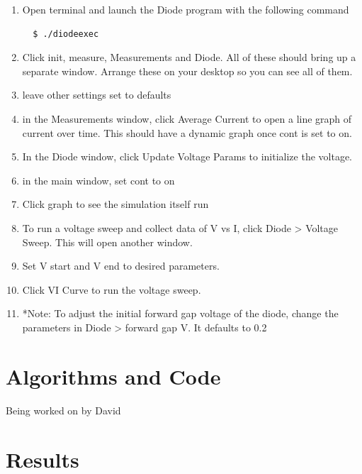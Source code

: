 \documentclass[a4paper]{article}
\begin{document}
\begin{enumerate}
\item Open terminal and launch the Diode program with the following command
\begin{verbatim}
  $ ./diodeexec
\end{verbatim}
\item Click init, measure, Measurements and Diode. All of these should bring up a separate window. Arrange these on your desktop so you can see all of them.
\item leave other settings set to defaults
\item in the Measurements window, click Average Current to open a line graph of current over time. This should have a dynamic graph once cont is set to on.
\item In the Diode window, click Update Voltage Params to initialize the voltage.
\item in the main window, set cont to on
\item Click graph to see the simulation itself run
\item To run a voltage sweep and collect data of V vs I, click Diode > Voltage Sweep. This will open another window.
\item Set V start and V end to desired parameters.
\item Click VI Curve to run the voltage sweep.
\item *Note: To adjust the initial forward gap voltage of the diode, change the parameters in Diode > forward gap V. It defaults to 0.2
\end{enumerate}
\section{Algorithms and Code}
\paragraph{}


Being worked on by David

\section{Results}
\end{document}
